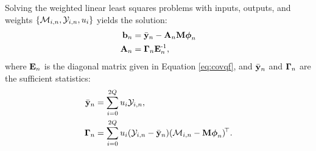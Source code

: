  Solving the weighted linear least squares problems with inputs, outputs, and weights 
$\{ \mathcal{M}_{i,n},  \mathcal{Y}_{i,n}, u_{i} \}$ yields the solution:
\newcommand{\ybar}{\bar\outs_n}
\newcommand{ \Cross}{\mat{\Gamma}_n}
\begin{align}
	 \intcpt_n & = \ybar - \Linmat_n \pWeights \feats_n \\
	\Linmat_n &= \Cross \covfn\inv \text{,}
\end{align}
where  $\mathbf{E}_n$ is the diagonal matrix given in Equation \eqref{eq:covqf}, and 
 $\ybar$ and $\Cross$ are the sufficient statistics:
\begin{align}
\ybar  &=  \sum_{i=0}^{2 \ltdim} \Sw_{i} \Sobs_{i,n} \text{,} \\
 \Cross &= \sum_{i=0}^{2\ltdim} \Sw_{i} (\Sobs_{i,n} - \ybar) (\Sfunc_{i,n} - \pWeights \feats_n)\transpose \text{.}
\end{align}







































